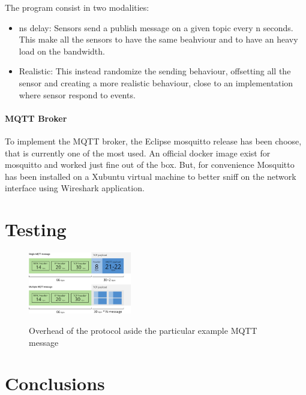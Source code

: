 \documentclass[journal]{IEEEtran}
\begin{document}
The program consist in two modalities: 

\begin{itemize}
	\item {n}s delay: Sensors send a publish message on a given topic every {n} seconds. This make all the sensors to have the same beahviour and to have an heavy load on the bandwidth. 
	\item Realistic: This instead randomize the sending behaviour, offsetting all the sensor and creating a more realistic behaviour, close to an implementation where sensor respond to events. 
\end{itemize}

\paragraph{MQTT Broker}
To implement the MQTT broker, the Eclipse mosquitto release has been choose, that is currently one of the most used. 
An official docker image exist for mosquitto and worked just fine out of the box. 
But, for convenience Mosquitto has been installed on a Xubuntu virtual machine to better sniff on the network interface using Wireshark application. 

\section{Testing}
\begin{figure}[h]
	\centering
	\includegraphics[width=0.4\textwidth]{mqtt_3}
	\label{fig:mqtt3}
	\caption{Overhead of the protocol aside the particular example MQTT message}
\end{figure}


\section{Conclusions}




\end{document}
